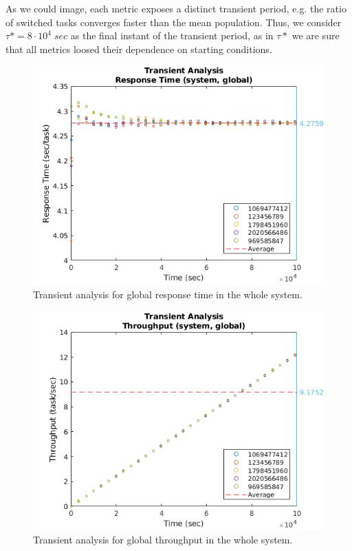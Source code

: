 As we could image, each metric exposes a distinct transient period, e.g. the ratio of switched tasks converges faster than the mean population. Thus, we consider $\tau*=8\cdot 10^{4}\;sec$ as the final instant of the transient period, as in $\tau*$ we are sure that all metrics loosed their dependence on starting conditions.

\begin{figure}
	\includegraphics[width=\columnwidth]{fig/evaluation-transient-analysis-response-time}
	\caption{Transient analysis for global response time in the whole system.}
	\label{fig:evaluation-transient-analysis-response-time}
\end{figure}

\begin{figure}
	\includegraphics[width=\columnwidth]{fig/evaluation-transient-analysis-throughput}
	\caption{Transient analysis for global throughput in the whole system.}
	\label{fig:evaluation-transient-analysis-throughput}
\end{figure}

